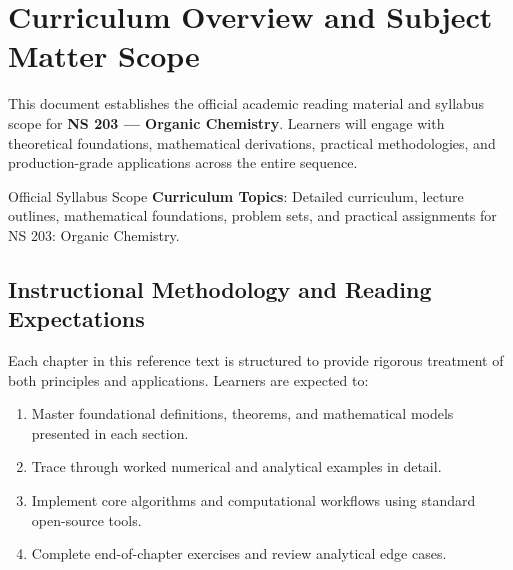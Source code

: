 \section{Curriculum Overview and Subject Matter Scope}

This document establishes the official academic reading material and syllabus scope for \textbf{NS 203 --- Organic Chemistry}. Learners will engage with theoretical foundations, mathematical derivations, practical methodologies, and production-grade applications across the entire sequence.

\begin{InsightBox}{Official Syllabus Scope}
  \textbf{Curriculum Topics}: Detailed curriculum, lecture outlines, mathematical foundations, problem sets, and practical assignments for NS 203: Organic Chemistry.
\end{InsightBox}

\subsection{Instructional Methodology and Reading Expectations}

Each chapter in this reference text is structured to provide rigorous treatment of both principles and applications. Learners are expected to:
\begin{enumerate}
  \item Master foundational definitions, theorems, and mathematical models presented in each section.
  \item Trace through worked numerical and analytical examples in detail.
  \item Implement core algorithms and computational workflows using standard open-source tools.
  \item Complete end-of-chapter exercises and review analytical edge cases.
\end{enumerate}


